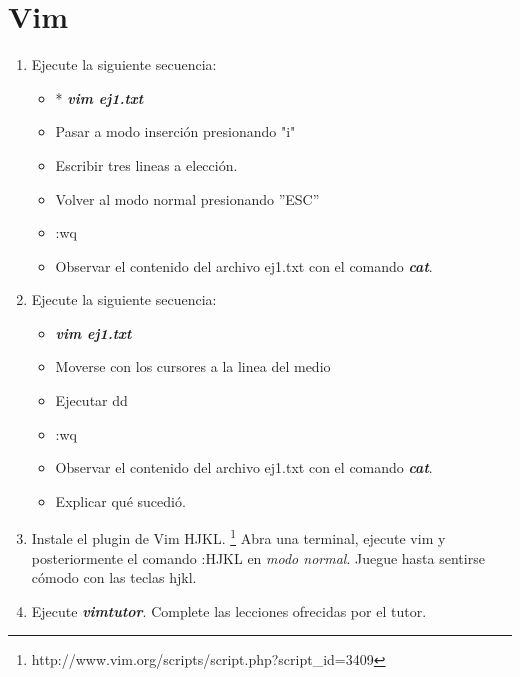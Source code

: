 \documentclass[12pt]{article}
\begin{document}
\section*{Vim}
\begin{enumerate}
\item Ejecute la siguiente secuencia:
	\begin{itemize}
	\item * \textit{\textbf{vim ej1.txt}}
        \item Pasar a modo inserción presionando "i"
        \item Escribir tres lineas a elección. 
        \item Volver al modo normal presionando ''ESC''
        \item :wq
	\item Observar el contenido del archivo ej1.txt con el comando \textbf{\textit{cat}}. 
	\end{itemize}
\item Ejecute la siguiente secuencia:
	\begin{itemize}
        \item \textbf{\textit{vim ej1.txt}}
        \item Moverse con los cursores a la linea del medio
        \item Ejecutar dd
        \item :wq
	\item Observar el contenido del archivo ej1.txt con el comando \textbf{\textit{cat}}. 
        \item Explicar qué sucedió. 
	\end{itemize}
\item Instale el plugin de Vim HJKL. 
 \footnote{http://www.vim.org/scripts/script.php?script\_id=3409}
Abra una terminal, ejecute vim y posteriormente el comando :HJKL en \textit{modo normal}. 
Juegue hasta sentirse cómodo con las teclas hjkl. 
\item Ejecute \textbf{\textit{vimtutor}}. Complete las lecciones ofrecidas por el tutor. 
\end{enumerate}
\end{document}
